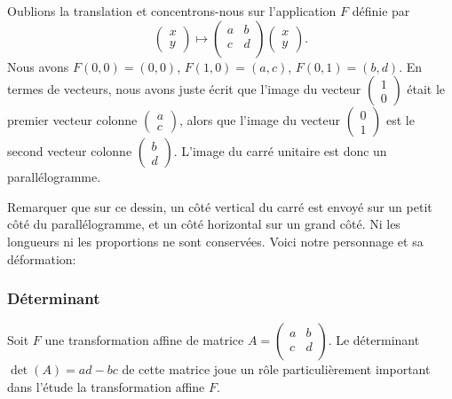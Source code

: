 \documentclass[11pt,class=report,crop=false]{standalone}
\begin{document}
Oublions la translation et concentrons-nous sur l'application $F$ définie par
$$\begin{pmatrix}x \\ y \end{pmatrix} \mapsto \begin{pmatrix}a & b \\ c & d \\  \end{pmatrix}
\begin{pmatrix}x \\ y \end{pmatrix}.$$
Nous avons $F(0,0)=(0,0)$, $F(1,0) = (a,c)$, $F(0,1)=(b,d)$.
En termes de vecteurs, nous avons juste écrit que l'image du vecteur $\begin{pmatrix}1 \\ 0 \end{pmatrix}$ était le premier vecteur colonne $\begin{pmatrix}a \\ c \end{pmatrix}$, alors que l'image du vecteur $\begin{pmatrix}0 \\ 1 \end{pmatrix}$ est le second vecteur colonne $\begin{pmatrix}b \\ d \end{pmatrix}$.
L'image du carré unitaire est donc un parallélogramme.


Remarquer que sur ce dessin, un côté vertical du carré est envoyé sur
un petit côté du parallélogramme, et un côté horizontal sur un grand côté.
Ni les longueurs ni les proportions ne sont conservées.
Voici notre personnage et sa déformation:


\subsubsection*{Déterminant}
Soit $F$ une transformation affine de matrice $A = \left(\begin{smallmatrix} a & b \\ c & d \\ 
\end{smallmatrix} \right)$.
Le déterminant $\det(A) = ad-bc$ de cette matrice joue un rôle particulièrement important dans l'étude la transformation affine $F$.
\end{document}
